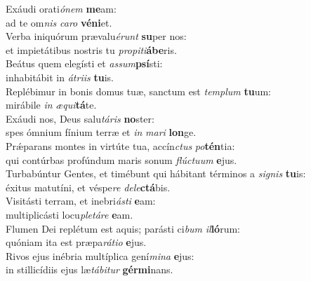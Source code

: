 \evenverse Exáudi orati\textit{ó}\textit{nem} \textbf{me}am:~\*\\
\evenverse ad te om\textit{nis} \textit{ca}\textit{ro} \textbf{vé}\textbf{ni}et.\\
\oddverse Verba iniquórum prævalu\textit{é}\textit{runt} \textbf{su}per nos:~\*\\
\oddverse et impietátibus nostris tu \textit{pro}\textit{pi}\textit{ti}\textbf{á}\textbf{be}ris.\\
\evenverse Beátus quem elegísti et \textit{as}\textit{sum}\textbf{psí}sti:~\*\\
\evenverse inhabitábit in \textit{á}\textit{tri}\textit{is} \textbf{tu}is.\\
\oddverse Replébimur in bonis domus tuæ, sanctum est \textit{tem}\textit{plum} \textbf{tu}um:~\*\\
\oddverse mirábile \textit{in} \textit{æ}\textit{qui}\textbf{tá}te.\\
\evenverse Exáudi nos, Deus salu\textit{tá}\textit{ris} \textbf{no}ster:~\*\\
\evenverse spes ómnium fínium terræ et \textit{in} \textit{ma}\textit{ri} \textbf{lon}ge.\\
\oddverse Prǽparans montes in virtúte tua, accín\textit{ctus} \textit{po}\textbf{tén}tia:~\*\\
\oddverse qui contúrbas profúndum maris sonum \textit{flú}\textit{ctu}\textit{um} \textbf{e}jus.\\
\evenverse Turbabúntur Gentes, et timébunt qui hábitant términos a \textit{si}\textit{gnis} \textbf{tu}is:~\*\\
\evenverse éxitus matutíni, et véspe\textit{re} \textit{de}\textit{le}\textbf{ctá}bis.\\
\oddverse Visitásti terram, et inebri\textit{á}\textit{sti} \textbf{e}am:~\*\\
\oddverse multiplicásti locu\textit{ple}\textit{tá}\textit{re} \textbf{e}am.\\
\evenverse Flumen Dei replétum est aquis; parásti ci\textit{bum} \textit{il}\textbf{ló}rum:~\*\\
\evenverse quóniam ita est præpa\textit{rá}\textit{ti}\textit{o} \textbf{e}jus.\\
\oddverse Rivos ejus inébria multíplica gení\textit{mi}\textit{na} \textbf{e}jus:~\*\\
\oddverse in stillicídiis ejus læ\textit{tá}\textit{bi}\textit{tur} \textbf{gér}\textbf{mi}nans.\\
